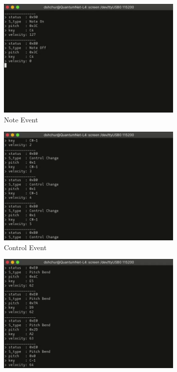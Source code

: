 \documentclass[12pt]{article}
\begin{document}
\begin{figure}[htb]
    \centering
    \begin{subfigure}{.49\textwidth}
        \centering
        \includegraphics[width=\linewidth]{img/midi_decode_note.png}
        \caption{Note Event}
        \label{fig:decode_note}
    \end{subfigure}
    \begin{subfigure}{.49\textwidth}
        \centering
        \includegraphics[width=\linewidth]{img/midi_decode_control.png}
        \caption{Control Event}
        \label{fig:decode_control}
    \end{subfigure}
    \begin{subfigure}{.5\textwidth}
        \centering
        \includegraphics[width=\linewidth]{img/midi_decode_pitch.png}

\end{subfigure}
\end{figure}
\end{document}
